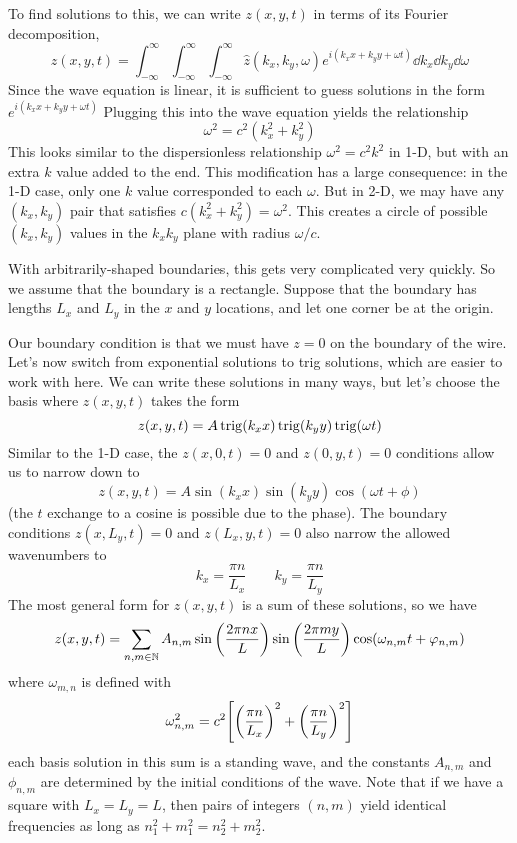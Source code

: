 To find solutions to this, we can write $z(x,y,t)$ in terms of its Fourier decomposition,
\[ z(x,y,t) = \int_{-\infty}^\infty\int_{-\infty}^\infty\int_{-\infty}^\infty \hat z(k_x, k_y, \omega)e^{i(k_xx+k_yy+\omega t)}\dd k_x\dd k_y\dd\omega\]
Since the wave equation is linear, it is sufficient to guess solutions in the form $e^{i(k_xx+k_yy+\omega t)}$ Plugging this into the wave equation yields the relationship
\[ \omega^2 = c^2(k_x^2+k_y^2) \]
This looks similar to the dispersionless relationship $\omega^2 = c^2k^2$ in 1-D, but with an extra $k$ value added to the end. This modification has a large consequence: in the 1-D case, only one $k$ value corresponded to each $\omega$. But in 2-D, we may have any $(k_x, k_y)$ pair that satisfies $c(k_x^2+k_y^2) = \omega^2$. This creates a circle of possible $(k_x,k_y)$ values in the $k_xk_y$ plane with radius $\omega/c$. 

With arbitrarily-shaped boundaries, this gets very complicated very quickly. So we assume that the boundary is a rectangle. Suppose that the boundary has lengths $L_x$ and $L_y$ in the $x$ and $y$ locations, and let one corner be at the origin.

Our boundary condition is that we must have $z=0$ on the boundary of the wire. Let's now switch from exponential solutions to trig solutions, which are easier to work with here. We can write these solutions in many ways, but let's choose the basis where $z(x,y,t)$ takes the form
\[ z(x,y,t) = A\operatorname{trig}(k_xx)\operatorname{trig}(k_yy)\operatorname{trig}(\omega t)\]
Similar to the 1-D case, the $z(x, 0,t)=0$ and $z(0,y,t)=0$ conditions allow us to narrow down to 
\[ z(x,y,t) = A\sin(k_xx)\sin(k_yy)\cos(\omega t+\phi) \]
(the $t$ exchange to a cosine is possible due to the phase). The boundary conditions $z(x,L_y,t) =0$ and $z(L_x, y, t) =0 $ also narrow the allowed wavenumbers to
\[ k_x = \frac{\pi n}{L_x} \quad\quad k_y = \frac{\pi n}{L_y}\]
The most general form for $z(x,y,t)$ is a sum of these solutions, so we have
\begin{align*}
    z(x,y,t) = \sum_{n,m\in \N} A_{n,m}\sin\pqty{\frac{2\pi nx}{L}}\sin\pqty{\frac{2\pi my}{L}}\cos(\omega_{n,m}t+\phi_{n,m})
\end{align*}
where $\omega_{m,n}$ is defined with
\[ \omega_{n,m}^2 = c^2 \bqty{\pqty{\frac{\pi n}{L_x}}^2 + \pqty{\frac{\pi n}{L_y}}^2}\]
each basis solution in this sum is a standing wave, and the constants $A_{n,m}$ and $\phi_{n,m}$ are determined by the initial conditions of the wave. Note that if we have a square with $L_x=L_y=L$, then pairs of integers $(n,m)$ yield identical frequencies as long as $n_1^2+m_1^2 = n_2^2+m_2^2$. 

